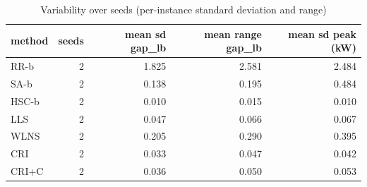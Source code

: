 \begin{table}[htbp]
\centering
\small
\caption{Variability over seeds (per-instance standard deviation and range)}
\label{tab:E4b_equal_budgets_60s_b60_seeds}
\begin{tabular}{lrrrr}
\toprule
method & seeds & mean sd gap\_lb & mean range gap\_lb & mean sd peak (kW) \\
\midrule
RR-b & 2 & 1.825 & 2.581 & 2.484 \\
SA-b & 2 & 0.138 & 0.195 & 0.484 \\
HSC-b & 2 & 0.010 & 0.015 & 0.010 \\
LLS & 2 & 0.047 & 0.066 & 0.067 \\
WLNS & 2 & 0.205 & 0.290 & 0.395 \\
CRI & 2 & 0.033 & 0.047 & 0.042 \\
CRI+C & 2 & 0.036 & 0.050 & 0.053 \\
\bottomrule
\end{tabular}
\end{table}
